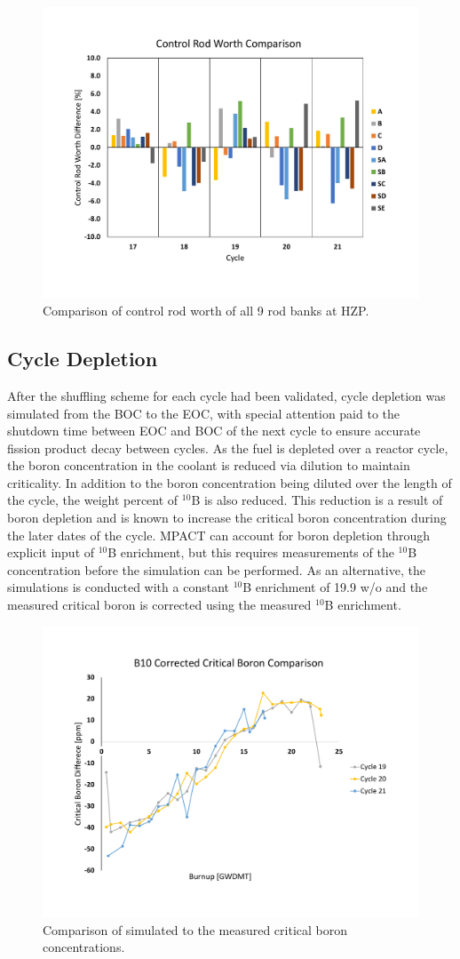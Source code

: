 \documentclass[edeposit,fullpage,12pt]{uiucthesis2009}
\begin{document}
\begin{figure}
\begin{center}
\includegraphics[trim={0 2cm 0 2cm},clip,width=0.5\linewidth]{./Figures/crw_diff.pdf}
\end{center}
\caption{Comparison of control rod worth of all 9 rod banks at HZP.}
\label{fig:crw}
\end{figure} 

\subsection{Cycle Depletion}
After the shuffling scheme for each cycle had been validated, cycle depletion was simulated from the \gls{BOC} to the \gls{EOC}, with special attention paid to the shutdown time between \gls{EOC} and \gls{BOC} of the next cycle to ensure accurate fission product decay between cycles. 
As the fuel is depleted over a reactor cycle, the boron concentration in the coolant is reduced via dilution to maintain criticality. 
In addition to the boron concentration being diluted over the length of the cycle, the weight percent of $^{10}$B is also reduced. 
This reduction is a result of boron depletion and is known to increase the critical boron concentration during the later dates of the cycle. 
MPACT can account for boron depletion through explicit input of $^{10}$B enrichment, but this requires measurements of the $^{10}$B concentration before the simulation can be performed.
As an alternative, the simulations is conducted with a constant $^{10}$B enrichment of 19.9 w/o and the measured critical boron is corrected using the measured $^{10}$B enrichment.
\begin{figure}
\begin{center}
\includegraphics[trim={0 2cm 0 3.1cm},clip,width=0.5\linewidth]{./Figures/corr_b.pdf}
\end{center}
\caption{Comparison of simulated to the measured critical boron concentrations.}
\label{fig:cor_b}
\end{figure} 
\end{document}
